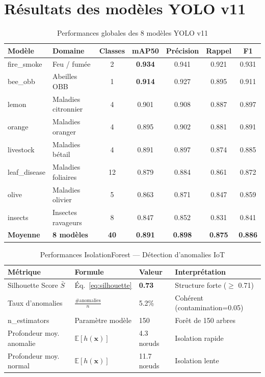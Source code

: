 \section{Résultats des modèles YOLO v11}

\begin{table}[H]\centering
\caption{Performances globales des 8 modèles YOLO v11}
\label{tab:yolo_results}
\small
\begin{tabular}{llccccc}
\toprule
\textbf{Modèle} & \textbf{Domaine} & \textbf{Classes} & \textbf{mAP50} &
\textbf{Précision} & \textbf{Rappel} & \textbf{F1} \\
\midrule
fire\_smoke   & Feu / fumée          & 2  & \textbf{0.934} & 0.941 & 0.921 & 0.931 \\
bee\_obb      & Abeilles OBB         & 1  & \textbf{0.914} & 0.927 & 0.895 & 0.911 \\
lemon         & Maladies citronnier  & 4  & 0.901          & 0.908 & 0.887 & 0.897 \\
orange        & Maladies oranger     & 4  & 0.895          & 0.902 & 0.881 & 0.891 \\
livestock     & Maladies bétail      & 4  & 0.891          & 0.897 & 0.874 & 0.885 \\
leaf\_disease & Maladies foliaires   & 12 & 0.879          & 0.884 & 0.861 & 0.872 \\
olive         & Maladies olivier     & 5  & 0.863          & 0.871 & 0.847 & 0.859 \\
insects       & Insectes ravageurs   & 8  & 0.847          & 0.852 & 0.831 & 0.841 \\
\midrule
\textbf{Moyenne} & \textbf{8 modèles} & \textbf{40} & \textbf{0.891} &
\textbf{0.898} & \textbf{0.875} & \textbf{0.886} \\
\bottomrule
\end{tabular}
\end{table}

\begin{table}[H]\centering
\caption{Performances IsolationForest — Détection d'anomalies IoT}
\label{tab:isof_results}
\begin{tabular}{llll}
\toprule
\textbf{Métrique} & \textbf{Formule} & \textbf{Valeur} & \textbf{Interprétation} \\
\midrule
Silhouette Score $\bar{S}$ & Éq.~\ref{eq:silhouette} & \textbf{0.73} & Structure forte ($\geq$ 0.71) \\
Taux d'anomalies           & $\frac{\#\text{anomalies}}{n}$ & 5.2\% & Cohérent (contamination=0.05) \\
n\_estimators              & Paramètre modèle & 150   & Forêt de 150 arbres \\
Profondeur moy. anomalie   & $\mathbb{E}[h(\mathbf{x})]$ & 4.3 nœuds & Isolation rapide \\
Profondeur moy. normal     & $\mathbb{E}[h(\mathbf{x})]$ & 11.7 nœuds & Isolation lente \\
\bottomrule
\end{tabular}
\end{table}

